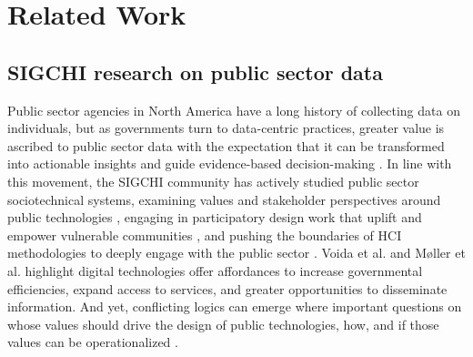 \section{Related Work}
\subsection{SIGCHI research on public sector data}


Public sector agencies in North America have a long history of collecting data on individuals, but as governments turn to data-centric practices, greater value is ascribed to public sector data with the expectation that it can be transformed into actionable insights and guide evidence-based decision-making \cite{Dencik_2019, Levy_2021}. In line with this movement, the SIGCHI community has actively studied public sector sociotechnical systems, examining values and stakeholder perspectives around public technologies \cite{haque2024we, kuo23, kelly24, kawakami2022, saxena2021framework2, stapleton2022has}, engaging in participatory design work that uplift and empower vulnerable communities \cite{LeDantec_2011, LeDantec2009, Yoo_2013, gondimalla24, Holten2021}, and pushing the boundaries of HCI methodologies to deeply engage with the public sector \cite{kuo23, halperin23, haque2024we, saxena2020conducting, wan2023community}. Voida et al. \cite{Voida2014} and Møller et al. \cite{Holtenshifting_2020} highlight digital technologies offer affordances to increase governmental efficiencies, expand access to services, and greater opportunities to disseminate information. And yet, conflicting logics can emerge where important questions on whose values should drive the design of public technologies, how, and if those values can be operationalized \cite{Voida2014}. 

